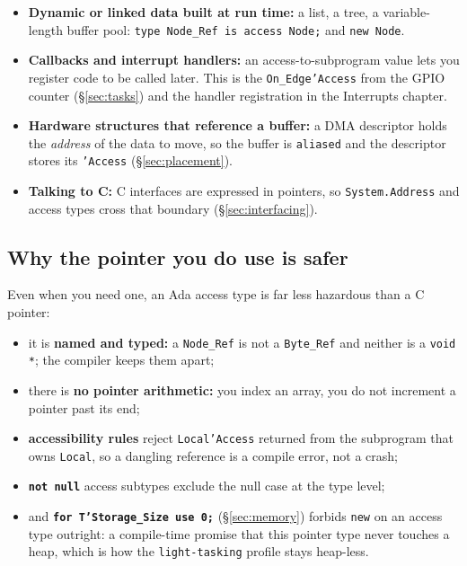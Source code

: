 \begin{itemize}
  \item \textbf{Dynamic or linked data built at run time:} a list, a tree, a
        variable-length buffer pool: \texttt{type Node\_Ref is access Node;} and
        \texttt{new Node}.
  \item \textbf{Callbacks and interrupt handlers:} an access-to-subprogram
        value lets you register code to be called later. This is the
        \texttt{On\_Edge'Access} from the GPIO counter (\S\ref{sec:tasks}) and the
        handler registration in the Interrupts chapter.
  \item \textbf{Hardware structures that reference a buffer:} a DMA descriptor
        holds the \emph{address} of the data to move, so the buffer is
        \texttt{aliased} and the descriptor stores its \texttt{'Access}
        (\S\ref{sec:placement}).
  \item \textbf{Talking to C:} C interfaces are expressed in pointers, so
        \texttt{System.Address} and access types cross that boundary
        (\S\ref{sec:interfacing}).
\end{itemize}

\subsection{Why the pointer you do use is safer}

Even when you need one, an Ada access type is far less hazardous than a C pointer:

\begin{itemize}
  \item it is \textbf{named and typed:} a \texttt{Node\_Ref} is not a
        \texttt{Byte\_Ref} and neither is a \texttt{void *}; the compiler keeps
        them apart;
  \item there is \textbf{no pointer arithmetic:} you index an array, you do not
        increment a pointer past its end;
  \item \textbf{accessibility rules} reject \texttt{Local'Access} returned from the
        subprogram that owns \texttt{Local}, so a dangling reference is a compile
        error, not a crash;
  \item \texttt{\textbf{not null}} access subtypes exclude the null case at the
        type level;
  \item and \texttt{\textbf{for T'Storage\_Size use 0;}} (\S\ref{sec:memory})
        forbids \texttt{new} on an access type outright: a compile-time promise
        that this pointer type never touches a heap, which is how the
        \texttt{light-tasking} profile stays heap-less.
\end{itemize}


